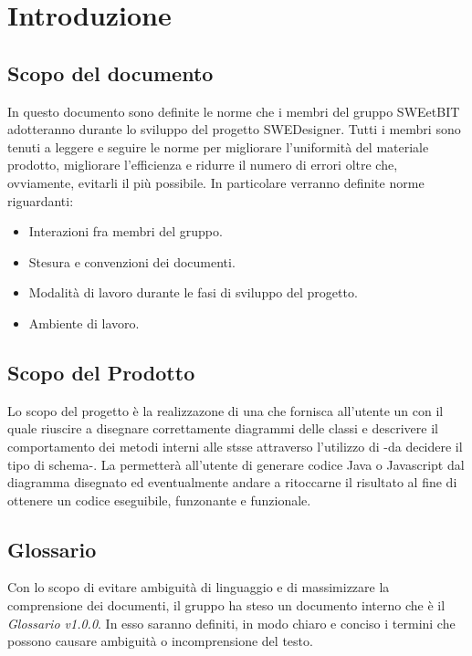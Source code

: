 \section{Introduzione}
  \subsection{Scopo del documento}
          In questo documento sono definite le norme che i membri del gruppo SWEetBIT adotteranno durante lo sviluppo del progetto SWEDesigner.
          Tutti i membri sono tenuti a leggere e seguire le norme per migliorare l’uniformità del materiale prodotto, migliorare l’efficienza
          e ridurre il numero di errori oltre che, ovviamente, evitarli il più possibile.
          In particolare verranno definite norme riguardanti:
            \begin{itemize}
              \item Interazioni fra membri del gruppo.
              \item Stesura e convenzioni dei documenti.
              \item Modalità di lavoro durante le fasi di sviluppo del progetto.
              \item Ambiente di lavoro.
            \end{itemize}
  \subsection{Scopo del Prodotto}
          Lo scopo del progetto è la realizzazone di una  che fornisca all'utente un   con il quale riuscire a disegnare correttamente diagrammi delle classi
          e descrivere il comportamento dei metodi interni alle stsse attraverso l'utilizzo di -da decidere il tipo di schema-.
          La  permetterà all'utente di generare codice Java o Javascript dal diagramma disegnato ed eventualmente andare a ritoccarne il risultato al fine di ottenere un codice
          eseguibile, funzonante e funzionale.
  \subsection{Glossario}
          Con lo scopo di evitare ambiguità di linguaggio e di massimizzare la comprensione dei documenti, il
          gruppo ha steso un documento interno che è il \emph{Glossario v1.0.0}. In esso saranno definiti, in modo
          chiaro e conciso i termini che possono causare ambiguità o incomprensione del testo.
